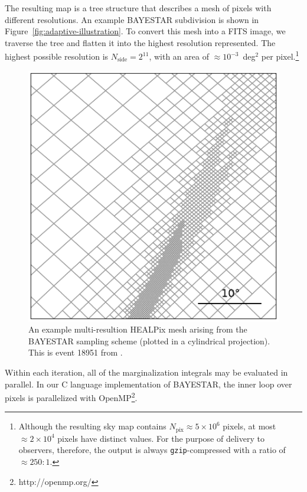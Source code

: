 \documentclass[amsmath,amssymb,aps,prx,reprint,nopreprintnumbers,nofootinbib]{revtex4-1}
\begin{document}
The resulting map is a tree structure that describes a mesh of pixels with different resolutions. An example \ac{BAYESTAR} subdivision is shown in Figure~\ref{fig:adaptive-illustration}. To convert this mesh into a FITS image, 
we traverse the tree and flatten it into the highest resolution represented. The highest possible resolution is $N_\mathrm{side}=2^{11}$, with an area of $\approx 10^{-3}$~deg$^2$ per pixel.\footnote{Although the resulting sky map contains $N_\mathrm{pix} \approx 5\times10^6$ pixels, at most $\approx 2\times10^4$ pixels have distinct values. For the purpose of delivery to observers, therefore, the output is always \texttt{gzip}\nobreakdashes-compressed with a ratio of $\approx 250:1$.}

\begin{figure}
    \includegraphics[width=\columnwidth]{adaptive_mesh}
    \caption{\label{fig:adaptive-mesh}An example multi\nobreakdashes-resultion \ac{HEALPix} mesh arising from the \ac{BAYESTAR} sampling scheme (plotted in a cylindrical projection). This is event 18951 from \cite{FirstTwoYears}.}
\end{figure}

Within each iteration, all of the marginalization integrals may be evaluated in parallel. In our C language implementation of \ac{BAYESTAR}, the inner loop over pixels is parallelized with OpenMP\footnote{http://openmp.org/}.
\end{document}
